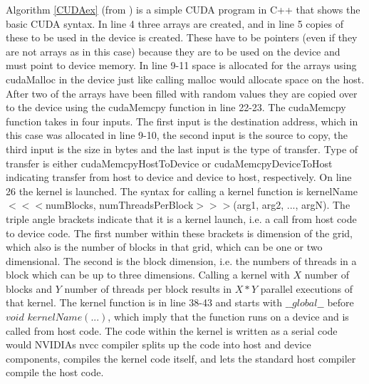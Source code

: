 Algorithm \ref{CUDAex} (from \cite{jason10}) is a simple CUDA program in C++ that shows the basic CUDA syntax. In line 4 three arrays are created, and in line 5 copies of these to be used in the device is created. These have to be pointers (even if they are not arrays as in this case) because they are to be used on the device and must point to device memory. In line 9-11 space is allocated for the arrays using cudaMalloc in the device just like calling malloc would allocate space on the host. After two of the arrays have been filled with random values they are copied over to the device using the cudaMemcpy function in line 22-23. The cudaMemcpy function takes in four inputs. The first input is the destination address, which in this case was allocated in line 9-10, the second input is the source to copy, the third input is the size in bytes and the last input is the type of transfer. Type of transfer is either cudaMemcpyHostToDevice or cudaMemcpyDeviceToHost indicating transfer from host to device and device to host, respectively. On line 26 the kernel is launched. The syntax for calling a kernel function is kernelName$<<<$numBlocks, numThreadsPerBlock$>>>$(arg1, arg2, ..., argN). The triple angle brackets indicate that it is a kernel launch, i.e. a call from host code to device code. The first number within these brackets is dimension of the grid, which also is the number of blocks in that grid, which can be one or two dimensional. The second is the block dimension, i.e. the numbers of threads in a block which can be up to three dimensions. Calling a kernel with $X$ number of blocks and $Y$ number of threads per block results in $X*Y$ parallel executions of that kernel. The kernel function is in line 38-43 and starts with $\_\_global\_\_$ before $void$ $kernelName(...)$, which imply that the function runs on a device and is called from host code. The code within the kernel is written as a serial code would 
NVIDIAs nvcc compiler splits up the code into host and device components, compiles the kernel code itself, and lets the standard host compiler compile the host code. 

\clearpage

















